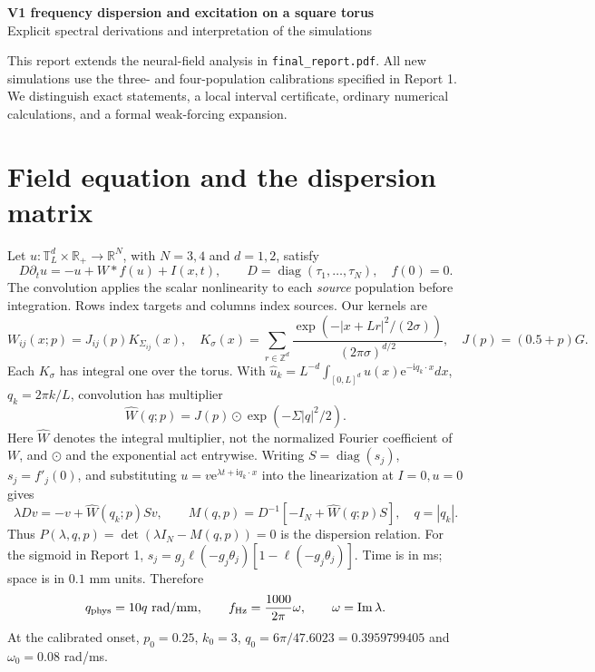 \documentclass[11pt]{article}
\newcommand{\ee}{\mathrm e}
\newcommand{\ii}{\mathrm i}
\newcommand{\Ima}{\operatorname{Im}}
\newcommand{\diag}{\operatorname{diag}}
\newcommand{\T}{\mathbb T}
\newcommand{\R}{\mathbb R}
\begin{document}
\begin{center}
{\large\bfseries V1 frequency dispersion and excitation on a square torus}\\[4pt]
Explicit spectral derivations and interpretation of the simulations
\end{center}
This report extends the neural-field analysis in \texttt{final\_report.pdf}.
All new simulations use the three- and four-population calibrations specified
in Report 1. We distinguish exact statements, a local interval certificate,
ordinary numerical calculations, and a formal weak-forcing expansion.

\section{Field equation and the dispersion matrix}
Let $u:\T_L^d\times\R_+\to\R^N$, with $N=3,4$ and $d=1,2$, satisfy
\begin{equation}
 D\partial_tu=-u+W*f(u)+I(x,t),\qquad
 D=\diag(\tau_1,\ldots,\tau_N),\quad f(0)=0.
 \label{eq:field}
\end{equation}
The convolution applies the scalar nonlinearity to each \emph{source} population
before integration. Rows index targets and columns index sources. Our kernels are
\begin{equation}
 W_{ij}(x;p)=J_{ij}(p)K_{\Sigma_{ij}}(x),\quad
 K_\sigma(x)=\sum_{r\in\mathbb Z^d}
 \frac{\exp(-|x+Lr|^2/(2\sigma))}{(2\pi\sigma)^{d/2}},\quad
 J(p)=(0.5+p)G.
 \label{eq:kernel}
\end{equation}
Each $K_\sigma$ has integral one over the torus. With
$\widehat u_k=L^{-d}\int_{[0,L]^d}u(x)\ee^{-\ii q_k\cdot x}dx$,
$q_k=2\pi k/L$, convolution has multiplier
\begin{equation}
 \widehat W(q;p)=J(p)\odot\exp(-\Sigma|q|^2/2).
 \label{eq:what}
\end{equation}
Here $\widehat W$ denotes the integral multiplier, not the normalized Fourier
coefficient of $W$, and $\odot$ and the exponential act entrywise.
Writing $S=\diag(s_j)$, $s_j=f'_j(0)$, and substituting
$u=v\ee^{\lambda t+\ii q_k\cdot x}$ into the linearization at $I=0,u=0$ gives
\begin{equation}
 \lambda Dv=-v+\widehat W(q_k;p)Sv,\qquad
 \boxed{M(q,p)=D^{-1}[-I_N+\widehat W(q;p)S]},\quad q=|q_k|.
 \label{eq:M}
\end{equation}
Thus $P(\lambda,q,p)=\det(\lambda I_N-M(q,p))=0$ is the dispersion relation.
For the sigmoid in Report 1, $s_j=g_j\ell(-g_j\theta_j)[1-\ell(-g_j\theta_j)]$.
Time is in ms; space is in $0.1$ mm units. Therefore
\begin{equation}
 q_{\rm phys}=10q\ \mathrm{rad/mm},\qquad
 f_{\rm Hz}=\frac{1000}{2\pi}\omega,\qquad \omega=\Ima\lambda.
\end{equation}
At the calibrated onset, $p_0=0.25$, $k_0=3$,
$q_0=6\pi/47.6023=0.3959799405$ and $\omega_0=0.08$ rad/ms.
\end{document}
